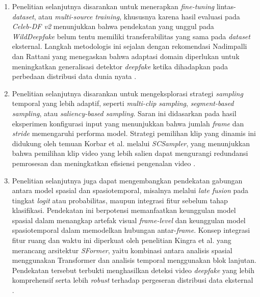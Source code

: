 \begin{enumerate}[noitemsep]
	\item Penelitian selanjutnya disarankan untuk menerapkan \textit{fine-tuning} lintas-\textit{dataset}, atau \textit{multi-source training}, khususnya karena hasil evaluasi pada \textit{Celeb-DF v2} menunjukkan bahwa pendekatan yang unggul pada \textit{WildDeepfake} belum tentu memiliki transferabilitas yang sama pada \textit{dataset} eksternal. Langkah metodologis ini sejalan dengan rekomendasi Nadimpalli dan Rattani yang menegaskan bahwa adaptasi domain diperlukan untuk meningkatkan generalisasi detektor \textit{deepfake} ketika dihadapkan pada perbedaan distribusi data dunia nyata \cite{nadimpalli2022improvingcrossdatasetgeneralizationdeepfake}.
	\item Penelitian selanjutnya disarankan untuk mengeksplorasi strategi \textit{sampling} temporal yang lebih adaptif, seperti \textit{multi-clip sampling}, \textit{segment-based sampling}, atau \textit{saliency-based sampling}. Saran ini didasarkan pada hasil eksperimen konfigurasi input yang menunjukkan bahwa jumlah \textit{frame} dan \textit{stride} memengaruhi performa model. Strategi pemilihan klip yang dinamis ini didukung oleh temuan Korbar et al. melalui \textit{SCSampler}, yang menunjukkan bahwa pemilihan klip video yang lebih salien dapat mengurangi redundansi pemrosesan dan meningkatkan efisiensi pengenalan video \cite{korbar2019scsamplersamplingsalientclips}.
	\item Penelitian selanjutnya juga dapat mengembangkan pendekatan gabungan antara model spasial dan spasiotemporal, misalnya melalui \textit{late fusion} pada tingkat \textit{logit} atau probabilitas, maupun integrasi fitur sebelum tahap klasifikasi. Pendekatan ini berpotensi memanfaatkan keunggulan model spasial dalam menangkap artefak visual \textit{frame-level} dan keunggulan model spasiotemporal dalam memodelkan hubungan antar-\textit{frame}. Konsep integrasi fitur ruang dan waktu ini diperkuat oleh penelitian Kingra et al. yang merancang arsitektur \textit{SFormer}, yaitu kombinasi antara analisis spasial menggunakan Transformer dan analisis temporal menggunakan blok lanjutan. Pendekatan tersebut terbukti menghasilkan deteksi video \textit{deepfake} yang lebih komprehensif serta lebih \textit{robust} terhadap pergeseran distribusi data eksternal \cite{KINGRA2024301817}.
\end{enumerate}
